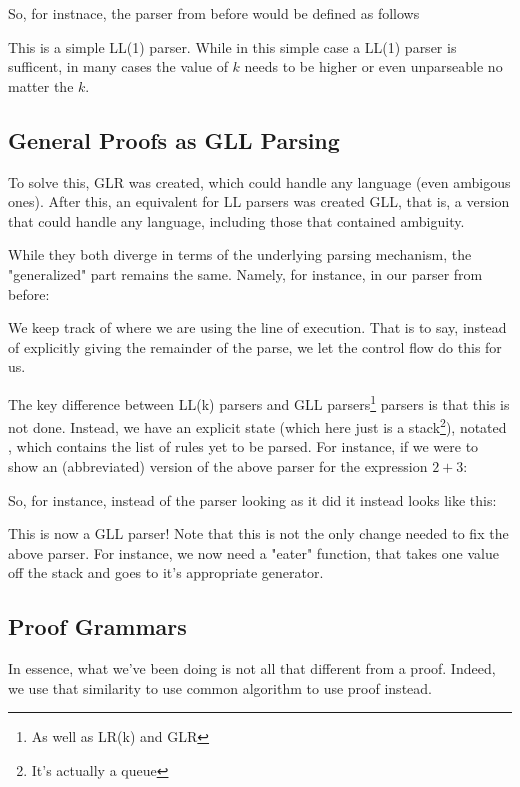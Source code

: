 So, for instnace, the parser from before would be defined as follows
\llparseA

This is a simple LL(1) parser. 
While in this simple case a LL(1) parser is sufficent, in many cases the value of $k$ needs to be higher or even unparseable no matter the $k$.

\subsection{General Proofs as GLL Parsing}
To solve this, GLR was created, which could handle any language (even ambigous ones)\cite{glrtomita}.
After this, an equivalent for LL parsers was created GLL, that is, a version that could handle any language, including those that contained ambiguity\cite{gllparse}.

While they both diverge in terms of the underlying parsing mechanism, the "generalized" part remains the same.
Namely, for instance, in our parser from before:
\llparseA

We keep track of where we are using the line of execution.
That is to say, instead of explicitly giving the remainder of the parse, we let the control flow do this for us. 

The key difference between LL(k) parsers and GLL parsers\footnote{As well as LR(k) and GLR} parsers is that this is not done.
Instead, we have an explicit state (which here just is a stack\footnote{It's actually a queue}), notated \pst, which contains the list of rules yet to be parsed.
For instance, if we were to show an (abbreviated) version of the above parser for the expression $2 + 3$:

So, for instance, instead of the parser looking as it did it instead looks like this:

This is now a GLL parser!
Note that this is not the only change needed to fix the above parser.
For instance, we now need a "eater" function, that takes one value off the stack and goes to it's appropriate generator.

\subsection{Proof Grammars}

In essence, what we've been doing is not all that different from a proof.
Indeed, we use that similarity to use common algorithm to use proof instead.


